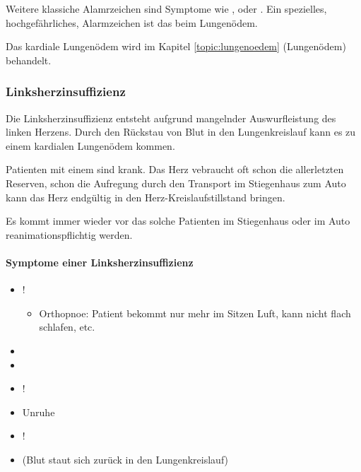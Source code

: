 Weitere klassiche Alamrzeichen sind Symptome wie
,  oder . Ein spezielles,
hochgefährliches, Alarmzeichen ist das
 beim Lungen\"odem. 

Das kardiale Lungen\"odem wird im Kapitel \ref{topic:lungenoedem} (Lungen\"odem)
behandelt. 


\subsubsection{Linksherzinsuffizienz}

Die Linksherzinsuffizienz entsteht aufgrund mangelnder Auswurfleistung
des linken Herzens. Durch den R\"uckstau von Blut in den
Lungenkreislauf kann es zu einem kardialen Lungen\"odem kommen. 

Patienten mit einem  sind  krank.
Das Herz vebraucht oft schon die allerletzten Reserven, schon die
Aufregung durch den Transport im Stiegenhaus zum Auto kann das Herz
endg\"ultig in den Herz-Kreislaufstillstand bringen. 

Es kommt immer wieder vor das solche Patienten im Stiegenhaus oder im
Auto reanimationspflichtig werden. 


\paragraph{Symptome einer Linksherzinsuffizienz}

\begin{itemize}
    \item {\mdseries
     !}
    
    \begin{itemize}
        \item Orthopnoe: Patient bekommt nur mehr im Sitzen Luft, kann nicht flach
        schlafen, etc.
    \end{itemize}
    \item {}
    \item {}
    \item {} !
    \item Unruhe
    \item {} !
    \item {} (Blut staut sich
    zur\"uck in den Lungenkreislauf)
\end{itemize}



